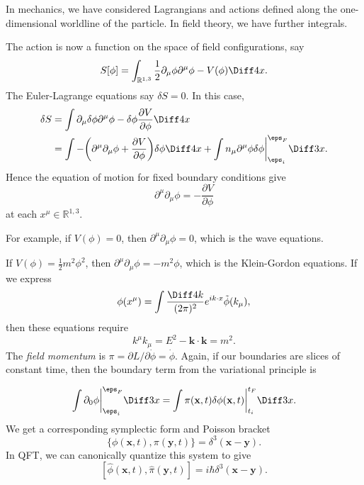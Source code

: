 \documentclass[12pt]{article}
\begin{document}
In mechanics, we have considered Lagrangians and actions defined along the one-dimensional worldline of the particle. In field theory, we have further integrals.

The action is now a function on the space of field configurations, say
\[
	S[\phi] = \int_{\mathbb{R}^{1,3}} \frac{1}{2} \partial_{\mu} \phi \partial^{\mu} \phi - V(\phi) \Diff4 x.
\]
The Euler-Lagrange equations say $\delta S = 0$. In this case,
\begin{align*}
	\delta S &= \int \partial_\mu \delta \phi \partial^\mu \phi - \delta \phi \frac{\partial V}{\partial \phi} \Diff 4 x \\
		 &= \int - \biggl(\partial^\mu \partial_\mu \phi + \frac{\partial V}{\partial \phi} \biggr) \delta \phi \Diff4 x + \int n_\mu \partial^\mu \phi \delta \phi \biggr|_{\eps_i}^{\eps_F} \Diff3 x.
\end{align*}
Hence the equation of motion for fixed boundary conditions give
\[
\partial^\mu \partial_\mu \phi = - \frac{\partial V}{\partial \phi}
\]
at each $x^\mu \in \mathbb{R}^{1,3}$.

For example, if $V(\phi) = 0$, then $\partial^\mu \partial_\mu \phi = 0$, which is the wave equations.

If $V(\phi) = \frac{1}{2} m^2 \phi^2$, then $\partial^\mu \partial_\mu \phi = - m^2 \phi$, which is the Klein-Gordon equations. If we express
\[
\phi(x^\mu) = \int \frac{\Diff 4 k}{(2 \pi)^2} e^{i k \cdot x} \tilde \phi(k_\mu),
\]
then these equations require
\[
k^\mu k_\mu = E^2 - \mathbf{k} \cdot \mathbf{k} = m^2.
\]
The \emph{field momentum} is $\pi = \partial L/\partial \dot \phi = \dot \phi$. Again, if our boundaries are slices of constant time, then the boundary term from the variational principle is

\[
\int \partial_0 \phi \biggr|_{\eps_i}^{\eps_F} \Diff 3 x = \int \pi(\mathbf{x}, t) \delta \phi(\mathbf{x}, t) \biggr|_{t_i}^{t_F} \Diff3 x.
\]
We get a corresponding symplectic form and Poisson bracket
\[
	\{\phi(\mathbf{x}, t), \pi(\mathbf{y}, t)\} = \delta^3(\mathbf{x} - \mathbf{y}).
\]
In QFT, we can canonically quantize this system to give
\[
	[\hat \phi(\mathbf{x}, t), \hat \pi(\mathbf{y}, t)] = i \hbar \delta^3(\mathbf{x} - \mathbf{y}).
\]


\newpage

\printindex
\end{document}
